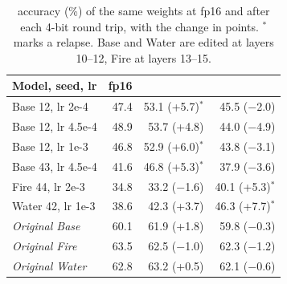 \begin{table}[t]
\centering\small\setlength{\tabcolsep}{3pt}
\begin{tabular}{@{}lrrr@{}}
\toprule
Model, seed, lr & fp16 & \fq{} & \nf{} \\
\midrule
Base 12, lr 2e-4 & 47.4 & 53.1 (+5.7)$^{*}$ & 45.5 ($-$2.0) \\
Base 12, lr 4.5e-4 & 48.9 & 53.7 (+4.8) & 44.0 ($-$4.9) \\
Base 12, lr 1e-3 & 46.8 & 52.9 (+6.0)$^{*}$ & 43.8 ($-$3.1) \\
Base 43, lr 4.5e-4 & 41.6 & 46.8 (+5.3)$^{*}$ & 37.9 ($-$3.6) \\
Fire 44, lr 2e-3 & 34.8 & 33.2 ($-$1.6) & 40.1 (+5.3)$^{*}$ \\
Water 42, lr 1e-3 & 38.6 & 42.3 (+3.7) & 46.3 (+7.7)$^{*}$ \\
\midrule
\emph{Original Base} & 60.1 & 61.9 (+1.8) & 59.8 ($-$0.3) \\
\emph{Original Fire} & 63.5 & 62.5 ($-$1.0) & 62.3 ($-$1.2) \\
\emph{Original Water} & 62.8 & 63.2 (+0.5) & 62.1 ($-$0.6) \\
\bottomrule
\end{tabular}
\caption{\wmdp{} accuracy (\%) of the same weights at fp16 and after each 4-bit round trip, with the change in points. $^{*}$ marks a relapse. Base and Water are edited at layers 10--12, Fire at layers 13--15.}
\label{tab:cases}
\end{table}
